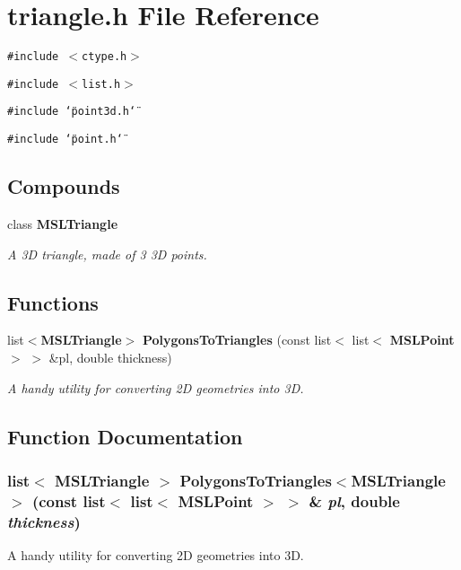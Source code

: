 \section{triangle.h File Reference}
\label{triangle_h}
{\tt \#include $<$ctype.h$>$}\par
{\tt \#include $<$list.h$>$}\par
{\tt \#include \char`\"{}point3d.h\char`\"{}}\par
{\tt \#include \char`\"{}point.h\char`\"{}}\par
\subsection*{Compounds}
\begin{CompactItemize}
\item 
class {\bf MSLTriangle}
\begin{CompactList}\small\item\em A 3D triangle, made of 3 3D points.\item\end{CompactList}\end{CompactItemize}
\subsection*{Functions}
\begin{CompactItemize}
\item 
list$<${\bf MSLTriangle}$>$ {\bf Polygons\-To\-Triangles} (const list$<$ list$<$ {\bf MSLPoint} $>$ $>$ \&pl, double thickness)
\begin{CompactList}\small\item\em A handy utility for converting 2D geometries into 3D.\item\end{CompactList}\end{CompactItemize}


\subsection{Function Documentation}
\subsubsection{\setlength{\rightskip}{0pt plus 5cm}list$<$ {\bf MSLTriangle} $>$ Polygons\-To\-Triangles$<${\bf MSLTriangle}$>$ (const list$<$ list$<$ {\bf MSLPoint} $>$ $>$ \& {\em pl}, double {\em thickness})}\label{triangle_h_a0}


A handy utility for converting 2D geometries into 3D.

